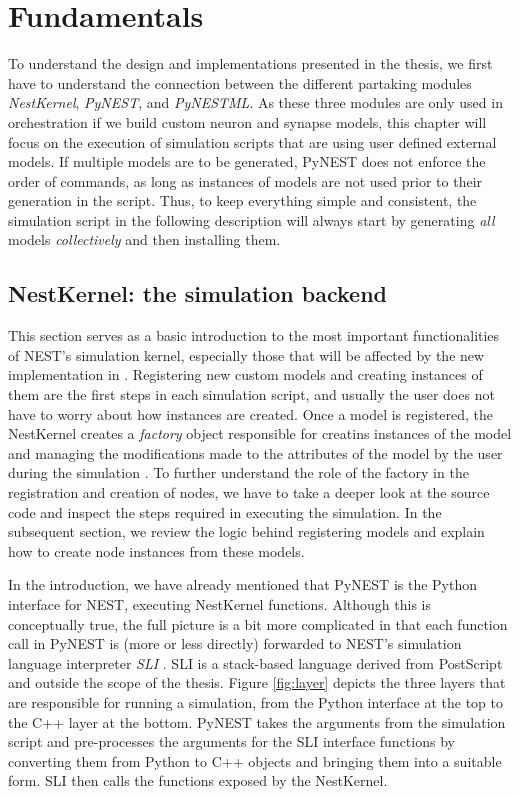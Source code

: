 \chapter{Fundamentals}
\label{chap:funds}


To understand the design and implementations presented in the thesis, we first have to understand the connection between the different partaking modules \emph{NestKernel}, \emph{PyNEST}, and \emph{PyNESTML}. As these three modules are only used in orchestration if we build custom neuron and synapse models, this chapter will focus on the execution of simulation scripts that are using user defined external models. If multiple models are to be generated, PyNEST does not enforce the order of commands, as long as instances of models are not used prior to their generation in the script. Thus, to keep everything simple and consistent, the simulation script in the following description will always start by generating \emph{all} models \emph{collectively} and then installing them.

\section{NestKernel: the simulation backend}

This section serves as a basic introduction to the most important functionalities of NEST's simulation kernel, especially those that will be affected by the new implementation in . Registering new custom models and creating instances of them are the first steps in each simulation script, and usually the user does not have to worry about how instances are created. Once a model is registered, the NestKernel creates a \emph{factory} object responsible for creatins instances of the model and managing the modifications made to the attributes of the model by the user during the simulation . To further understand the role of the factory in the registration and creation of nodes, we have to take a deeper look at the source code and inspect the steps required in executing the simulation. In the subsequent section, we review the logic behind registering models and explain how to create node instances from these models.

In the introduction, we have already mentioned that PyNEST is the Python interface for NEST, executing NestKernel functions. Although this is conceptually true, the full picture is a bit more complicated in that each function call in PyNEST is (more or less directly) forwarded to NEST's simulation language interpreter \emph{SLI} \citep{gewaltig2007nest}. SLI is a stack-based language derived from PostScript \citep{adobe1990postscript} and outside the scope of the thesis. Figure \ref{fig:layer} depicts the three layers that are responsible for running a simulation, from the Python interface at the top to the C++ layer at the bottom. PyNEST takes the arguments from the simulation script and pre-processes the arguments for the SLI interface functions by converting them from Python to C++ objects and bringing them into a suitable form. SLI then calls the functions exposed by the NestKernel.

